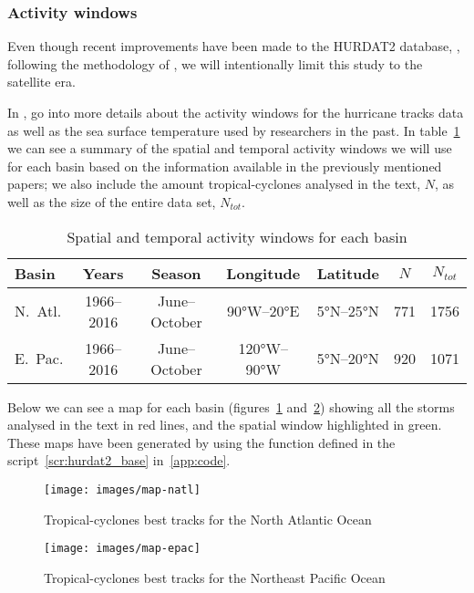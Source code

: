 \subsubsection{Activity windows}\label{ssec:act-windows}
Even though recent improvements have been made to the HURDAT2 database, \cite{o:hurdat-comparison,Landsea2014,Landsea2016}, following the methodology of \citeauthor{Corral2010}, we will intentionally limit this study to the satellite era.

In \cite{Webster2005}, \citeauthor{Webster2005} go into more details about the activity windows for the hurricane tracks data as well as the sea surface temperature used by researchers in the past. In table~\ref{tab:act-windows} we can see a summary of the spatial and temporal activity windows we will use for each basin based on the information available in the previously mentioned papers; we also include the amount tropical-cyclones analysed in the text, $N$, as well as the size of the entire data set, $N_{tot}$.
\begin{table}[H]
	\centering
	\begin{tabular}{l c c c c c c}
		\toprule
		\toprule
		Basin & Years & Season & Longitude & Latitude & $N$ & $N_{tot}$ \\
		\midrule
		N.~Atl. & 1966--2016 & June--October & \ang{90}W--\ang{20}E  & \ang{5}N--\ang{25}N & \num{771} & \num{1756}  \\
		E.~Pac. & 1966--2016 & June--October & \ang{120}W--\ang{90}W & \ang{5}N--\ang{20}N & \num{920} & \num{1071}  \\
		\bottomrule
	\end{tabular}
	\caption{Spatial and temporal activity windows for each basin}
	\label{tab:act-windows}
\end{table}

Below we can see a map for each basin (figures~\ref{fig:map-natl} and~\ref{fig:map-epac}) showing all the storms analysed in the text in red lines, and the spatial window highlighted in green. These maps have been generated by using the function  defined in the script~\ref{scr:hurdat2_base} in~\cref{app:code}.
\begin{figure}[H]
	\centering
	\texttt{[image: images/map-natl]}
	\caption{Tropical-cyclones best tracks for the North Atlantic Ocean}
	\label{fig:map-natl}
\end{figure}

\begin{figure}[H]
	\centering
	\texttt{[image: images/map-epac]}
	\caption{Tropical-cyclones best tracks for the Northeast Pacific Ocean}
	\label{fig:map-epac}
\end{figure}
